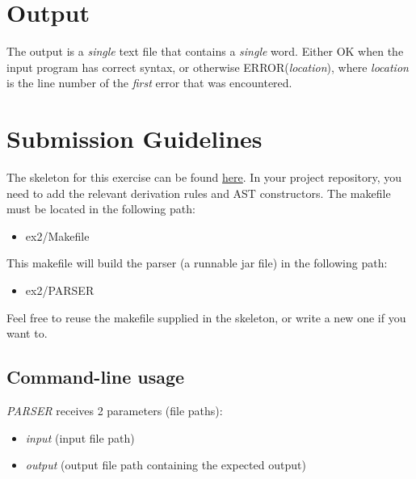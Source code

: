 \documentclass{article}
\begin{document}
\section{Output}
The output is a \textit{single} text file that contains a \textit{single} word.
Either OK when the input program has correct syntax,
or otherwise ERROR(\textit{location}), where \textit{location}
is the line number of the \textit{first} error that was encountered.

\section{Submission Guidelines}
The skeleton for this exercise can be found \href{https://github.com/davidtr1037/compilation-tau/tree/master/src/ex2}{here}.
In your project repository, you need to add the relevant derivation rules and AST constructors.
The makefile must be located in the following path:
\begin{itemize}
    \item ex2/Makefile
\end{itemize}
This makefile will build the parser (a runnable jar file) in the following path:
\begin{itemize}
    \item ex2/PARSER
\end{itemize}
Feel free to reuse the makefile supplied in the skeleton, or write a new one if you want to.

\subsection{Command-line usage}
\textit{PARSER} receives 2 parameters (file paths):
\begin{itemize}
    \item \textit{input} (input file path)
    \item \textit{output} (output file path containing the expected output)
\end{itemize}
\end{document}
